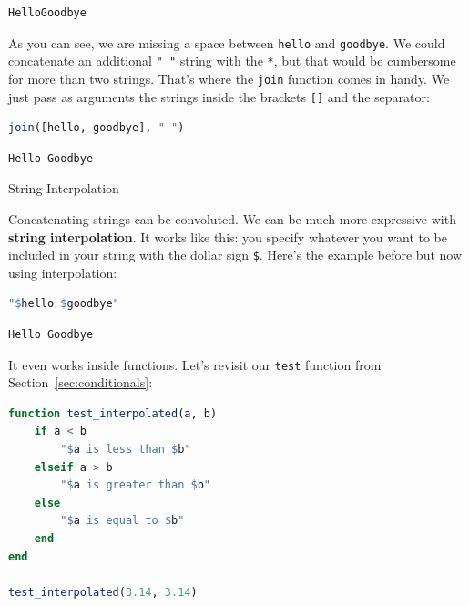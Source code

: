 \documentclass[
  notoc %
]{tufte-book}
\makeatletter
\newcommand{\passthrough}[1]{#1}
\renewcommand\subsubsection{%
\@startsection{subsubsection}{3}{\z@ }{-3.25ex\@plus -1ex \@minus -.2ex}{1.5ex \@plus .2ex}{\normalfont \normalsize \bfseries }
}
\makeatother
\begin{document}
\begin{lstlisting}[language=Output]
HelloGoodbye
\end{lstlisting}

As you can see, we are missing a space between
\passthrough{\lstinline!hello!} and \passthrough{\lstinline!goodbye!}.
We could concatenate an additional \passthrough{\lstinline!" "!} string
with the \passthrough{\lstinline!*!}, but that would be cumbersome for
more than two strings. That's where the \passthrough{\lstinline!join!}
function comes in handy. We just pass as arguments the strings inside
the brackets \passthrough{\lstinline![]!} and the separator:

\begin{lstlisting}[language=Julia]
join([hello, goodbye], " ")
\end{lstlisting}

\begin{lstlisting}[language=Output]
Hello Goodbye
\end{lstlisting}

\hypertarget{sec:string_interpolation}{%
\subsubsection{String Interpolation}\label{sec:string_interpolation}}

Concatenating strings can be convoluted. We can be much more expressive
with \textbf{string interpolation}. It works like this: you specify
whatever you want to be included in your string with the dollar sign
\passthrough{\lstinline!$!}. Here's the example before but now using
interpolation:

\begin{lstlisting}[language=Julia]
"$hello $goodbye"
\end{lstlisting}

\begin{lstlisting}[language=Output]
Hello Goodbye
\end{lstlisting}

It even works inside functions. Let's revisit our
\passthrough{\lstinline!test!} function from
Section~\ref{sec:conditionals}:

\begin{lstlisting}[language=Julia]
function test_interpolated(a, b)
    if a < b
        "$a is less than $b"
    elseif a > b
        "$a is greater than $b"
    else
        "$a is equal to $b"
    end
end

test_interpolated(3.14, 3.14)
\end{lstlisting}
\end{document}
